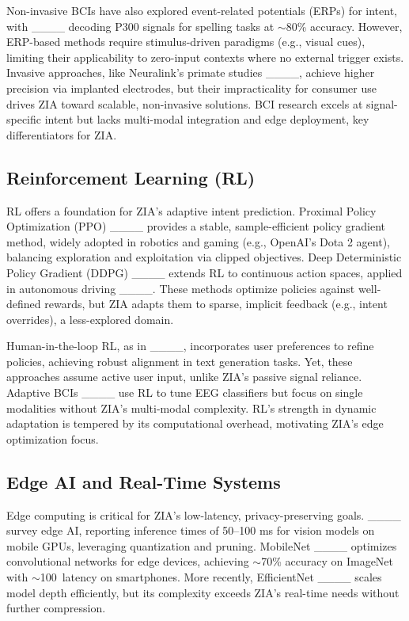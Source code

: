 Non-invasive BCIs have also explored event-related potentials (ERPs) for intent, with ____ decoding P300 signals for spelling tasks at $\sim$80\% accuracy. However, ERP-based methods require stimulus-driven paradigms (e.g., visual cues), limiting their applicability to zero-input contexts where no external trigger exists. Invasive approaches, like Neuralink's primate studies ____, achieve higher precision via implanted electrodes, but their impracticality for consumer use drives ZIA toward scalable, non-invasive solutions. BCI research excels at signal-specific intent but lacks multi-modal integration and edge deployment, key differentiators for ZIA.

\subsection{Reinforcement Learning (RL)}
RL offers a foundation for ZIA's adaptive intent prediction. Proximal Policy Optimization (PPO) ____ provides a stable, sample-efficient policy gradient method, widely adopted in robotics and gaming (e.g., OpenAI's Dota 2 agent), balancing exploration and exploitation via clipped objectives. Deep Deterministic Policy Gradient (DDPG) ____ extends RL to continuous action spaces, applied in autonomous driving ____. These methods optimize policies against well-defined rewards, but ZIA adapts them to sparse, implicit feedback (e.g., intent overrides), a less-explored domain.

Human-in-the-loop RL, as in ____, incorporates user preferences to refine policies, achieving robust alignment in text generation tasks. Yet, these approaches assume active user input, unlike ZIA's passive signal reliance. Adaptive BCIs ____ use RL to tune EEG classifiers but focus on single modalities without ZIA's multi-modal complexity. RL's strength in dynamic adaptation is tempered by its computational overhead, motivating ZIA's edge optimization focus.

\subsection{Edge AI and Real-Time Systems}
Edge computing is critical for ZIA's low-latency, privacy-preserving goals. ____ survey edge AI, reporting inference times of 50–100 ms for vision models on mobile GPUs, leveraging quantization and pruning. MobileNet ____ optimizes convolutional networks for edge devices, achieving $\sim$70\% accuracy on ImageNet with $\sim$100\, latency on smartphones. More recently, EfficientNet ____ scales model depth efficiently, but its complexity exceeds ZIA's real-time needs without further compression.



